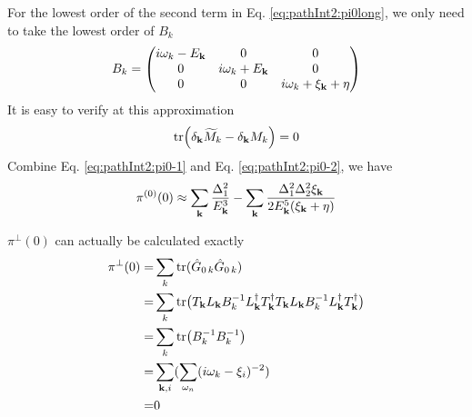 For the lowest order of the second term in Eq. \eqref{eq:pathInt2:pi0long}, we only need to take the lowest order of $B_{k}$
\begin{equation}
B_{k}=\begin{pmatrix}i\omega_{k}-E_{\mathbf{k}}&0&0\\0&i\omega_{k}+E_{\mathbf{k}}&0\\0&0&i\omega_{k}+\xi_{\mathbf{k}}+\eta\end{pmatrix}
\end{equation}
It is easy to verify at this approximation
\begin{equation}\label{eq:pathInt2:pi0-2}
\text{tr}\Big(\delta_{\mathbf{k}}\widetilde{M}_{k}-\delta_{\mathbf{k}}M_{k}\Big)=0
\end{equation}
Combine Eq. \eqref{eq:pathInt2:pi0-1} and Eq. \eqref{eq:pathInt2:pi0-2}, we have 
\begin{equation}
\pi^{(0)}(0)\approx\sum_{\mathbf{k}}\frac{\Delta_{1}^{2}}{E_{\mathbf{k}}^{3}}-\sum_{\mathbf{k}}\frac{\Delta_{1}^{2}\Delta_{2}^{2}\xi_{\mathbf{k}}}{2E_{\mathbf{k}}^{5}(\xi_{\mathbf{k}}+\eta)}\end{equation}

$\pi^{\perp}(0)$ can actually be calculated   exactly
\begin{equation}
\begin{split}
\pi^{\perp}(0)=&\sum_k\text{tr}(\hat{G}_{0\,k}\hat{G}_{0\,k})\\
	=&\sum_k\text{tr}\big(T_{\mathbf{k}}L_{\mathbf{k}}B_{k}^{-1}L_{\mathbf{k}}^{\dagger}T_{\mathbf{k}}^{\dagger}T_{\mathbf{k}}L_{\mathbf{k}}B_{k}^{-1}L_{\mathbf{k}}^{\dagger}T_{\mathbf{k}}^{\dagger}\big)\\
	=&\sum_k\text{tr}\big(B_{k}^{-1}B_{k}^{-1}\big)\\
	=&\sum_{\mathbf{k},i}(\sum_{\omega_{n}}(i\omega_{k}-\xi_{i})^{-2})\\
	=&0
\end{split}
\end{equation}



